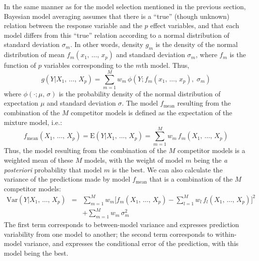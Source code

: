 In the same manner as for the model selection mentioned in the previous section, Bayesian model averaging assumes that there is a ``true'' (though unknown) relation between the response variable and the $p$ effect variables, and that each model differs from this ``true'' relation according to a normal distribution of standard deviation $\sigma_m$. In other words, density $g_m$
is the density of the normal distribution of mean 
$f_m(x_1,\,\ldots,\,x_p)$ and standard deviation $\sigma_m$, where $f_m$ is the function of $p$ variables corresponding to the $m$th
model. Thus,
\[
g(Y|X_1,\,\ldots,\,X_p)=\sum_{m=1}^Mw_m\,\phi(Y;f_m(x_1,\,\ldots,\,x_p),\;
\sigma_m)
\]
where $\phi(\cdot;\mu,\,\sigma)$ is the probability density of the normal distribution of expectation $\mu$ and standard deviation $\sigma$. The model 
$f_{\mathrm{mean}}$ resulting from the combination of the $M$ competitor models is defined as the expectation of the mixture model, i.e.:
\[
f_{\mathrm{mean}}(X_1,\,\ldots,\,X_p)=\mbox{E}(Y|X_1,\,\ldots,\,X_p)=\sum_{m=1}^Mw_m\,
f_m(X_1,\,\ldots,\,X_p)
\]
Thus, the model resulting from the combination of the $M$ competitor models is a weighted mean of these $M$ models, with the weight of model $m$ being the \textit{a posteriori} probability that model $m$ is the best. We can also calculate the variance of the predictions made by model $f_{\mathrm{mean}}$
that is a combination of the $M$ competitor models:
\begin{eqnarray*}
\mbox{Var}(Y|X_1,\,\ldots,\,X_p) &=& \sum_{m=1}^Mw_m\Big[
f_m(X_1,\,\ldots,\,X_p)-\sum_{l=1}^Mw_l\,f_l(X_1,\,\ldots,\,X_p)\Big]^2
\\ && +\sum_{m=1}^Mw_m\,\sigma_m^2
\end{eqnarray*}
The first term corresponds to between-model variance and expresses prediction variability from one model to another; the second term corresponds to within-model variance, and expresses the conditional error of the prediction, with this model being the best.

